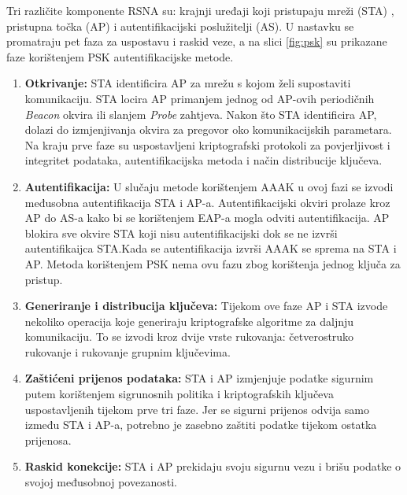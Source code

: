 \documentclass[times, utf8, diplomski]{fer}
\begin{document}
Tri različite komponente RSNA su: krajnji uređaji koji pristupaju mreži (STA) , pristupna točka (AP)  i autentifikacijski poslužitelji (AS). U nastavku se promatraju pet faza za uspostavu i raskid veze, a na slici \ref{fig:psk} su prikazane faze korištenjem PSK autentifikacijske metode.
\begin{enumerate}
    \item\textbf{Otkrivanje:} STA identificira AP za mrežu s kojom želi supostaviti komunikaciju. STA locira AP primanjem jednog od AP-ovih periodičnih \emph{Beacon} okvira ili slanjem \emph{Probe} zahtjeva. Nakon što STA identificira AP, dolazi do izmjenjivanja okvira za pregovor oko komunikacijskih parametara. Na kraju prve faze su uspostavljeni kriptografski protokoli za povjerljivost i integritet podataka, autentifikacijska metoda i način distribucije ključeva.
    \item\textbf{Autentifikacija:} U slučaju metode korištenjem AAAK u ovoj fazi se izvodi međusobna autentifikacija STA i AP-a. Autentifikacijski okviri prolaze kroz AP do AS-a kako bi se korištenjem EAP-a mogla odviti autentifikacija. AP blokira sve okvire STA koji nisu autentifikacijski dok se ne izvrši autentifikaijca STA.Kada se autentifikacija izvrši AAAK se sprema na STA i AP. Metoda korištenjem PSK nema ovu fazu zbog korištenja jednog ključa za pristup.
    \item\textbf{Generiranje i distribucija ključeva:} Tijekom ove faze AP i STA izvode nekoliko operacija koje generiraju kriptografske algoritme za daljnju komunikaciju. To se izvodi kroz dvije vrste rukovanja: četverostruko rukovanje i rukovanje grupnim ključevima.
    \item\textbf{Zaštićeni prijenos podataka:} STA i AP izmjenjuje podatke sigurnim putem korištenjem sigrunosnih politika i kriptografskih ključeva uspostavljenih tijekom prve tri faze. Jer se sigurni prijenos odvija samo između STA i AP-a, potrebno je zasebno zaštiti podatke tijekom ostatka prijenosa.
    \item\textbf{Raskid konekcije:} STA i AP prekidaju svoju sigurnu vezu i brišu podatke o svojoj međusobnoj povezanosti\citep{NIST}.
\end{enumerate}
\end{document}
